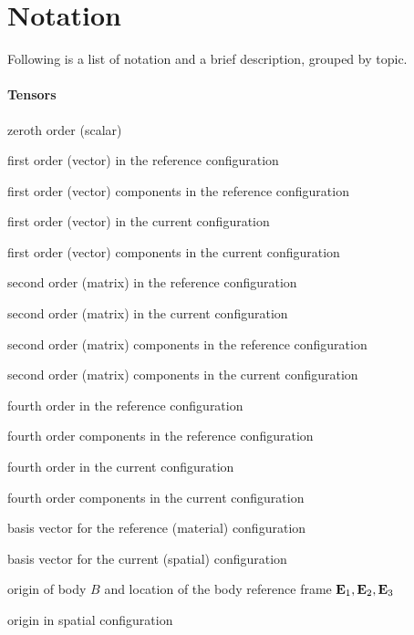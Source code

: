 \chapter{Notation}

Following is a list of notation and a brief description, grouped by topic.

\noindent\subsubsection*{Tensors}

\begin{description}[noitemsep,align=right,labelwidth=1.5cm,labelsep=0.8cm]
\item [$a$] zeroth order (scalar)
\item 
\item [$\vA$] first order (vector) in the reference configuration
\item [$A_I$] first order (vector) components in the reference configuration
\item [$\va$] first order (vector) in the current configuration
\item [$a_i$] first order (vector) components in the current configuration
\item 
\item [$\tAbold$] second order (matrix) in the reference configuration
\item [$\tabold$] second order (matrix) in the current configuration
\item [$\tA_{IJ}$] second order (matrix) components in the reference configuration
\item [$\ta_{ij}$] second order (matrix) components in the current configuration
\item 
\item [$\fotA$] fourth order in the reference configuration
\item [$\fotA_{IJKL}$] fourth order components in the reference configuration
\item [$\fota$] fourth order in the current configuration
\item [$\fota_{ijkl}$] fourth order components in the current configuration
\item 
\item [$\vEsubI$] basis vector for the reference (material) configuration
\item [$\vesubi$] basis vector for the current (spatial) configuration
\item 
\item [$O$] origin of body $B$ and location of the body reference frame $\mathbf{E}_1, \mathbf{E}_2, \mathbf{E}_3$
\item [$o$] origin in spatial configuration
\end{description}


